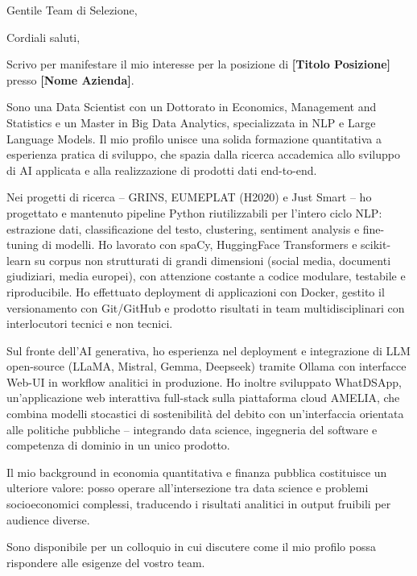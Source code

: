 \documentclass[11pt,a4paper,sans]{moderncv}
\begin{document}
\date{\today}
\opening{Gentile Team di Selezione,}
\closing{Cordiali saluti,}
\makelettertitle

Scrivo per manifestare il mio interesse per la posizione di \textbf{[Titolo Posizione]} presso \textbf{[Nome Azienda]}.

Sono una Data Scientist con un Dottorato in Economics, Management and Statistics e un Master in Big Data Analytics, specializzata in NLP e Large Language Models. Il mio profilo unisce una solida formazione quantitativa a esperienza pratica di sviluppo, che spazia dalla ricerca accademica allo sviluppo di AI applicata e alla realizzazione di prodotti dati end-to-end.

Nei progetti di ricerca -- GRINS, EUMEPLAT (H2020) e Just Smart -- ho progettato e mantenuto pipeline Python riutilizzabili per l'intero ciclo NLP: estrazione dati, classificazione del testo, clustering, sentiment analysis e fine-tuning di modelli. Ho lavorato con spaCy, HuggingFace Transformers e scikit-learn su corpus non strutturati di grandi dimensioni (social media, documenti giudiziari, media europei), con attenzione costante a codice modulare, testabile e riproducibile. Ho effettuato deployment di applicazioni con Docker, gestito il versionamento con Git/GitHub e prodotto risultati in team multidisciplinari con interlocutori tecnici e non tecnici.

Sul fronte dell'AI generativa, ho esperienza nel deployment e integrazione di LLM open-source (LLaMA, Mistral, Gemma, Deepseek) tramite Ollama con interfacce Web-UI in workflow analitici in produzione. Ho inoltre sviluppato WhatDSApp, un'applicazione web interattiva full-stack sulla piattaforma cloud AMELIA, che combina modelli stocastici di sostenibilità del debito con un'interfaccia orientata alle politiche pubbliche -- integrando data science, ingegneria del software e competenza di dominio in un unico prodotto.

Il mio background in economia quantitativa e finanza pubblica costituisce un ulteriore valore: posso operare all'intersezione tra data science e problemi socioeconomici complessi, traducendo i risultati analitici in output fruibili per audience diverse.

Sono disponibile per un colloquio in cui discutere come il mio profilo possa rispondere alle esigenze del vostro team.

\makeletterclosing
\end{document}

